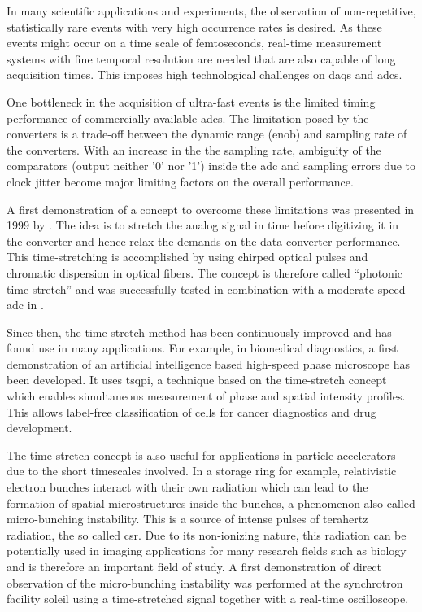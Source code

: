 In many scientific applications and experiments, the observation of non-repetitive, statistically rare events with very high occurrence rates is desired.
As these events might occur on a time scale of femtoseconds, real-time measurement systems with fine temporal resolution are needed that are also capable of long acquisition times.
This imposes high technological challenges on \glspl{daq} and \glspl{adc}.

One bottleneck in the acquisition of ultra-fast events is the limited timing performance of commercially available \glspl{adc}. 
The limitation posed by the converters is a trade-off between the dynamic range (\gls{enob}) and sampling rate of the converters.
With an increase in the the sampling rate, ambiguity of the comparators (output neither '0' nor '1') inside the \gls{adc} and sampling errors due to clock jitter become major limiting factors on the overall performance. \cite{Mahjoubfar2017}

A first demonstration of a concept to overcome these limitations was presented in 1999 by \cite{ts_adc}. 
The idea is to stretch the analog signal in time before digitizing it in the converter and hence relax the demands on the data converter performance. 
This time-stretching is accomplished by using chirped optical pulses and chromatic dispersion in optical fibers.
The concept is therefore called ``photonic time-stretch'' and was successfully tested in combination with a moderate-speed \gls{adc} in \cite{ts_adc}.

Since then, the time-stretch method has been continuously improved and has found use in many applications.
For example, in biomedical diagnostics, a first demonstration of an artificial intelligence based high-speed phase microscope has been developed. 
It uses \gls{tsqpi}, a technique based on the time-stretch concept which enables simultaneous measurement of phase and spatial intensity profiles.
This allows label-free classification of cells for cancer diagnostics and drug development. \cite{Mahjoubfar2017} 

The time-stretch concept is also useful for applications in particle accelerators due to the short timescales involved.
In a storage ring for example, relativistic electron bunches interact with their own radiation which can lead to the formation of spatial microstructures inside the bunches, a phenomenon also called micro-bunching instability.
This is a source of intense pulses of terahertz radiation, the so called \gls{csr}. 
Due to its non-ionizing nature, this radiation can be potentially used in imaging applications for many research fields such as biology and is therefore an important field of study. 
A first demonstration of direct observation of the micro-bunching instability was performed at the synchrotron facility \gls{soleil} using a time-stretched signal together with a real-time oscilloscope. \cite{roussel2015}

